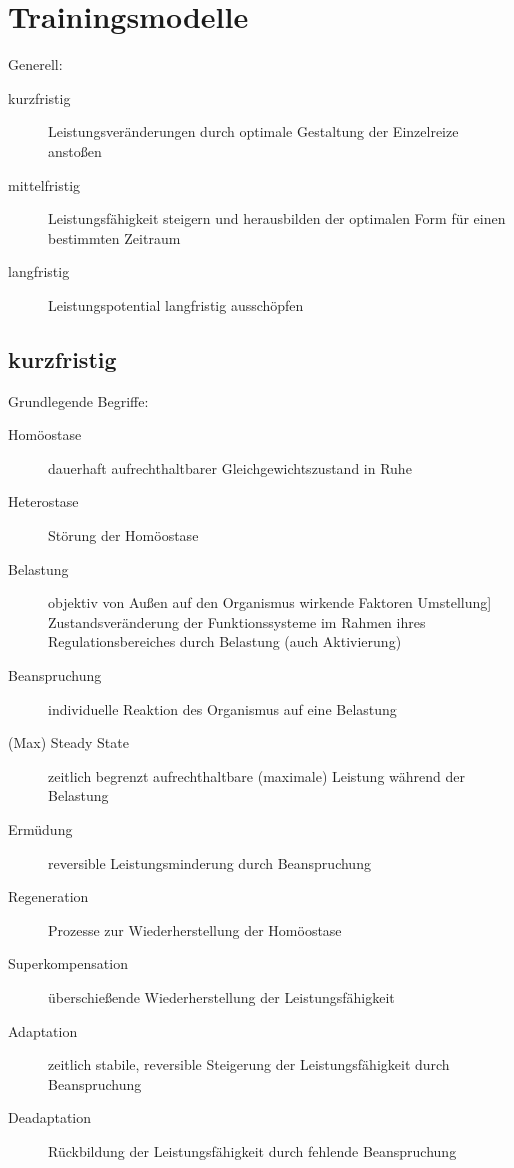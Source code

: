 
\section{Trainingsmodelle}

Generell:
\begin{description}
    \item[kurzfristig] Leistungsveränderungen durch optimale Gestaltung der Einzelreize anstoßen
    \item [mittelfristig] Leistungsfähigkeit steigern und herausbilden der optimalen Form für einen bestimmten Zeitraum
    \item [langfristig] Leistungspotential langfristig ausschöpfen
\end{description}

\subsection{kurzfristig}

Grundlegende Begriffe:
\begin{description}
    \item [Homöostase] dauerhaft aufrechthaltbarer Gleichgewichtszustand in Ruhe
    \item [Heterostase] Störung der Homöostase
    \item [Belastung] objektiv von Außen auf den Organismus wirkende Faktoren Umstellung] Zustandsveränderung der Funktionssysteme im Rahmen ihres Regulationsbereiches durch Belastung (auch Aktivierung)
    \item [Beanspruchung] individuelle Reaktion des Organismus auf eine Belastung
    \item [(Max) Steady State] zeitlich begrenzt aufrechthaltbare (maximale) Leistung während der Belastung
    \item [Ermüdung] reversible Leistungsminderung durch Beanspruchung
    \item [Regeneration] Prozesse zur Wiederherstellung der Homöostase
    \item [Superkompensation] überschießende Wiederherstellung der Leistungsfähigkeit
    \item [Adaptation] zeitlich stabile, reversible Steigerung der Leistungsfähigkeit durch Beanspruchung
    \item [Deadaptation] Rückbildung der Leistungsfähigkeit durch fehlende Beanspruchung
\end{description}

